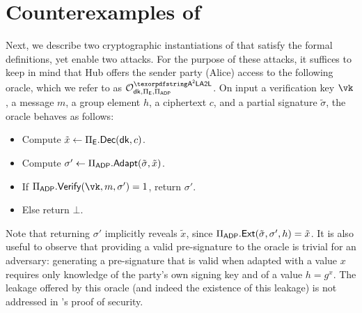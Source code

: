\section{Counterexamples of \aal}\label{sec:cryptanalysis}

Next, we describe two cryptographic instantiations of \aal that satisfy the formal definitions, yet enable two attacks. For the purpose of these attacks, it suffices to keep in mind that Hub offers the sender party (Alice) access to the following oracle, which we refer to as $\oracle^{\AAL}_{\dk,\Pi_\ENC,\Pi_\ADP}$. On input a verification key $\vk$, a message $m$, a group element $h$, a ciphertext $c$, and a partial signature $\tilde{\sigma}$, the oracle behaves as follows:
\begin{itemize}
    \item Compute $\tilde{x} \gets \Pi_{\mathsf{E}}.{\mathsf{Dec}}(\mathsf{dk}, c)$.
    \item Compute $\sigma' \gets \Pi_{\mathsf{ADP}}.\mathsf{Adapt}(\tilde{\sigma},\tilde{x})$.
    \item If $\Pi_\ADP.\vrfy(\vk,m,\sigma')=1$, return $\sigma'$.
    \item Else return $\bot$.
\end{itemize}
Note that returning $\sigma'$ implicitly reveals $\tilde{x}$, since $\Pi_{\mathsf{ADP}}.{\mathsf{Ext}}(\tilde{\sigma},\sigma',h) = \tilde{x}$. It is also useful to observe that providing a valid pre-signature to the \aal oracle is trivial for an adversary: generating a pre-signature  that is valid when adapted with a value $x$ requires only knowledge of the party's own signing key and of a value $h = g^x$. The leakage offered by this oracle (and indeed the existence of this leakage) is not addressed in \aal's proof of security.



